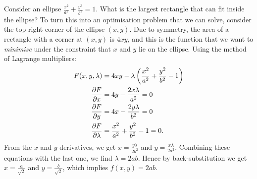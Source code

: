 \documentclass[../multivariate_calculus.tex]{subfiles}
\begin{document}
        \begin{example}
            Consider an ellipse $\frac{x^2}{a^2}+\frac{y^2}{b^2}=1$.
            What is the largest rectangle that can fit inside the ellipse?
            To turn this into an optimisation problem that we can solve, consider the top right corner of the ellipse $(x,y)$.
            Due to symmetry, the area of a rectangle with a corner at $(x,y)$ is $4xy$, and this is the function that we want to \textit{minimise} under the constraint that $x$ and $y$ lie on the ellipse.
            Using the method of Lagrange multipliers:
            \begin{align}
                F(x,y,\lambda)&=4xy-\lambda\left(\frac{x^2}{a^2}+\frac{y^2}{b^2}-1\right)\\
                \frac{\partial F}{\partial x}&=4y-\frac{2x\lambda}{a^2}=0\\
                \frac{\partial F}{\partial y}&=4x-\frac{2y\lambda}{b^2}=0\\
                \frac{\partial F}{\partial\lambda}&=\frac{x^2}{a^2}+\frac{y^2}{b^2}-1=0.
            \end{align}
            From the $x$ and $y$ derivatives, we get $x=\frac{y\lambda}{2b^2}$ and $y=\frac{x\lambda}{2a^2}$.
            Combining these equations with the last one, we find $\lambda=2ab$.
            Hence by back-substitution we get $x=\frac{a}{\sqrt{2}}$ and $y=\frac{b}{\sqrt{2}}$, which implies $f(x,y)=2ab$.
        \end{example}
\end{document}
